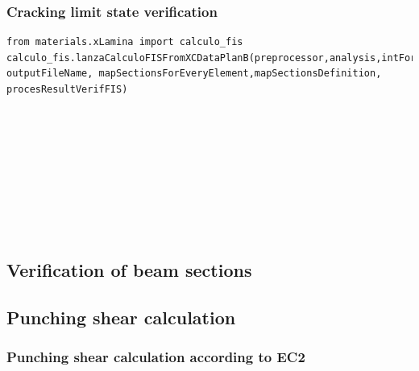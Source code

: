 \subsubsection{Cracking limit state verification}
\begin{verbatim}
from materials.xLamina import calculo_fis
calculo_fis.lanzaCalculoFISFromXCDataPlanB(preprocessor,analysis,intForcCombFileName,
outputFileName, mapSectionsForEveryElement,mapSectionsDefinition,
procesResultVerifFIS)
\end{verbatim}
\begin{paramFuncTable}
\preprocessor{} \\
\analysis{} \\
\\
\outputFileName{}\\
\mapSectionsForEveryElement{} \\
\mapSectionsDefinition{} \\
\mapInteractionDiagrams{} \\
\procesResultVerifFIS{} \\
\end{paramFuncTable}


\subsection{Verification of beam sections}

\subsection{Punching shear calculation}

\subsubsection{Punching shear calculation according to EC2}
